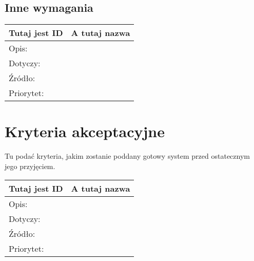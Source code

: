 \documentclass[a4paper,10pt]{article}
\begin{document}
\subsection{Inne wymagania}
 
\begin{center}
\begin{tabular}{|l|l|} \hline

Tutaj jest ID & A tutaj nazwa \\ \hline
Opis: &  \\ \hline
Dotyczy: &  \\ \hline
Źródło: &  \\ \hline
Priorytet: &  \\ \hline

\end{tabular}
\end{center} 
 
\section{Kryteria akceptacyjne}

Tu podać kryteria, jakim zostanie poddany gotowy system przed ostatecznym jego przyjęciem.

\begin{center}
\begin{tabular}{|l|l|} \hline

Tutaj jest ID & A tutaj nazwa \\ \hline
Opis: &  \\ \hline
Dotyczy: &  \\ \hline
Źródło: &  \\ \hline
Priorytet: &  \\ \hline

\end{tabular}
\end{center}


\clearpage
{}
{}

\end{document}
